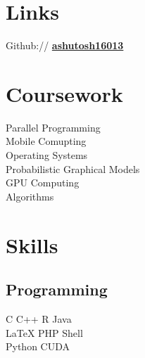 \documentclass[letterpaper]{deedy-resume} %
\begin{document}
\begin{minipage}[t]{0.33\textwidth}

	     \sectionspace %


	     \section{Links} 

Github:// \href{https://github.com/ashutosh16013}{\bf ashutosh16013}

\sectionspace %


\section{Coursework}
Parallel Programming \\
		 Mobile Comupting \\
		 Operating Systems \\
		 Probabilistic Graphical Models \\
		 GPU Computing \\ 
		 Algorithms

		 \sectionspace %


		 \section{Skills}

		 \subsection{Programming}

		 C \textbullet{} C++ \textbullet{} R \textbullet{} Java \\
			 \LaTeX \textbullet{} PHP  \textbullet{} Shell\\
				 Python \textbullet{} CUDA

				 \sectionspace %


\end{minipage}
\end{document}
